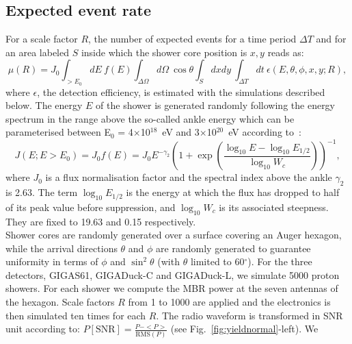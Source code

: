 \subsection {Expected event rate}
\label{sec:eventnumber}
For  a scale  factor $R$,  the number  of expected  events for  a time
period $\Delta T$ and for an  area labeled $S$ inside which the shower
core position is $x,y$ reads as:
\begin{equation}
	\mu(R) = J_0\int_{>E_0}dE~f(E) \int_{\Delta \Omega}d\Omega~\cos{\theta}\int_{S}dxdy~\int_{\Delta T}dt~\epsilon(E,\theta,\phi,x,y;R),
\end{equation}
where  $\epsilon$, the  detection  efficiency, is  estimated with  the
simulations  described  below.   The  energy  $E$  of  the  shower  is
generated randomly  following the energy  spectrum in the  range above
the so-called ankle energy which  can be parameterised between E$_0$ =
4$\times$10$^{18}$~eV      and     3$\times$10$^{20}$~eV     according
to~\cite{schulz}:
\begin{equation}
J(E;   E  >   E_0)   = J_0 f(E) = J_0   E^{-\gamma_2}   \left(1+  \exp   \left({
  \frac{\log_{10}E          -          \log_{10}E_{1/2}}{\log_{10}W_c}
}\right)\right)^{-1},
\end{equation}
where  $J_0$ is  a flux  normalisation factor  and the  spectral index
above the ankle $\gamma_2$ is 2.63. The term $\log_{10}E_{1/2}$ is the
energy at which the flux has  dropped to half of its peak value before
suppression, and $\log_{10}W_c$ is  its associated steepness. They are
fixed to  19.63 and  0.15 respectively. \\  Shower cores  are randomly
generated over a surface covering  an Auger hexagon, while the arrival
directions  $\theta$ and  $\phi$ are  randomly generated  to guarantee
uniformity  in terms  of  $\phi$ and  $\sin^2{\theta}$ (with  $\theta$
limited  to  60$^\circ$).  For  the  three detectors,  \mbox{GIGAS61},
\mbox{GIGADuck-C} and \mbox{GIGADuck-L}, we  simulate 5000 proton showers.  For each
shower we compute the MBR power  at the seven antennas of the hexagon.
Scale factors  $R$ from 1 to  1000 are applied and  the electronics is
then  simulated  ten  times  for  each $R$.   The  radio  waveform  is
transformed  in SNR  unit according  to: $P  [\text{SNR}] =  \frac{P -
  <P>}{\text{RMS}(P)}$   (see   Fig.~\ref{fig:yieldnormal}-left).   We
